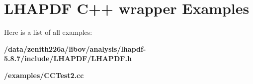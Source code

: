 \section{LHAPDF C++ wrapper Examples}
Here is a list of all examples:\begin{CompactItemize}
\item 
\bf{/data/zenith226a/libov/analysis/lhapdf-5.8.7/include/LHAPDF/LHAPDF.h}
\item 
\bf{/examples/CCTest2.cc}
\end{CompactItemize}
